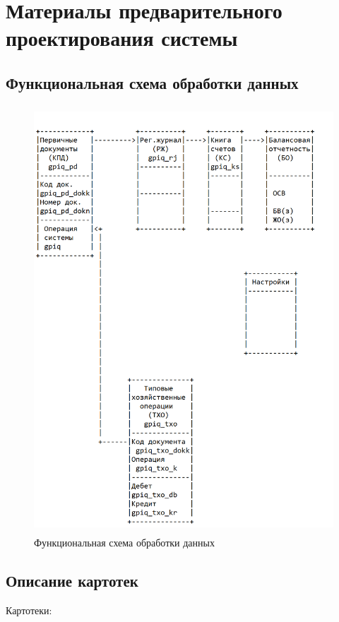 \section{Материалы предварительного проектирования системы}
\subsection{Функциональная схема обработки данных}

\begin{figure}[!htb]
    \centering
    \includegraphics[height=16cm]
        {_assets/gpiq_part2.png}
    \caption{Функциональная схема обработки данных}
    \label{fig:gpiq_part2}
\end{figure}

\subsection{Описание картотек}

Картотеки:

